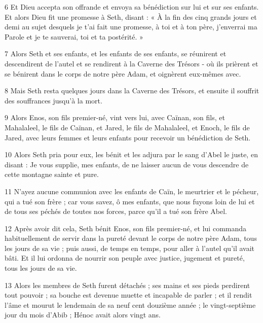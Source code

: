 \par 6 Et Dieu accepta son offrande et envoya sa bénédiction sur lui et sur ses enfants. Et alors Dieu fit une promesse à Seth, disant : « À la fin des cinq grands jours et demi au sujet desquels je t'ai fait une promesse, à toi et à ton père, j'enverrai ma Parole et je te sauverai, toi et ta postérité. »

\par 7 Alors Seth et ses enfants, et les enfants de ses enfants, se réunirent et descendirent de l'autel et se rendirent à la Caverne des Trésors - où ils prièrent et se bénirent dans le corps de notre père Adam, et oignèrent eux-mêmes avec.

\par 8 Mais Seth resta quelques jours dans la Caverne des Trésors, et ensuite il souffrit des souffrances jusqu'à la mort.

\par 9 Alors Enos, son fils premier-né, vint vers lui, avec Caïnan, son fils, et Mahalaleel, le fils de Caïnan, et Jared, le fils de Mahalaleel, et Enoch, le fils de Jared, avec leurs femmes et leurs enfants pour recevoir un bénédiction de Seth.

\par 10 Alors Seth pria pour eux, les bénit et les adjura par le sang d'Abel le juste, en disant : Je vous supplie, mes enfants, de ne laisser aucun de vous descendre de cette montagne sainte et pure.

\par 11 N'ayez aucune communion avec les enfants de Caïn, le meurtrier et le pécheur, qui a tué son frère ; car vous savez, ô mes enfants, que nous fuyons loin de lui et de tous ses péchés de toutes nos forces, parce qu'il a tué son frère Abel.

\par 12 Après avoir dit cela, Seth bénit Enos, son fils premier-né, et lui commanda habituellement de servir dans la pureté devant le corps de notre père Adam, tous les jours de sa vie ; puis aussi, de temps en temps, pour aller à l'autel qu'il avait bâti. Et il lui ordonna de nourrir son peuple avec justice, jugement et pureté, tous les jours de sa vie.

\par 13 Alors les membres de Seth furent détachés ; ses mains et ses pieds perdirent tout pouvoir ; sa bouche est devenue muette et incapable de parler ; et il rendit l'âme et mourut le lendemain de sa neuf cent douzième année ; le vingt-septième jour du mois d'Abib ; Hénoc avait alors vingt ans.

